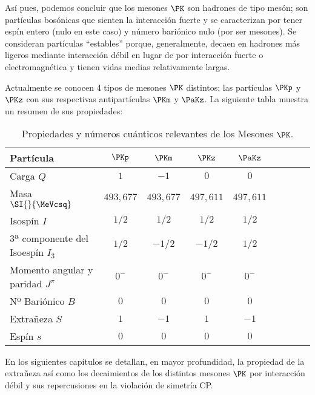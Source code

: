Así pues, podemos concluir que los mesones $\PK$ son hadrones de tipo mesón; son partículas bosónicas que sienten la interacción fuerte y se caracterizan por tener espín entero (nulo en este caso) y número bariónico nulo (por ser mesones). Se consideran partículas ``estables'' porque, generalmente, decaen en hadrones más ligeros mediante interacción débil en lugar de por interacción fuerte o electromagnética y tienen vidas medias relativamente largas.

Actualmente se conocen 4 tipos de mesones $\PK$ distintos: las partículas $\PKp$ y $\PKz$ con sus respectivas antipartículas $\PKm$ y $\PaKz$. La siguiente tabla muestra un resumen de sus propiedades:\\

\begin{table}[h]
	\centering
	\begin{tabular}{l*{7}{c}r}
\hline
Partícula & $\PKp$ & $\PKm$ & $\PKz$ & $\PaKz$ \\ 
\hline
Carga $Q$ & $1$ & $-1$ & $0$ & $0$\\
Masa $\SI{}{\MeVcsq}$ & $493,677$ & $493,677$ & $497,611$ & $497,611$\\
Isospín $I$ & $1/2$ & $1/2$ & $1/2$ & $1/2$ \\
3ª componente del Isoespín $I_3$ & $1/2$ & $-1/2$ & $-1/2$ & $1/2$ \\
Momento angular y paridad $J^\pi$ & $0^-$ & $0^-$ & $0^-$ & $0^-$ \\
Nº Bariónico $B$ & $0$ & $0$ & $0$ & $0$\\
Extrañeza $S$ & $1$ & $-1$ & $1$ & $-1$\\
Espín $s$ & $0$ & $0$ & $0$ & $0$\\ 
\hline
	\end{tabular}
\caption[Propiedades y números cuánticos relevantes de los Mesones $\PK$]{Propiedades y números cuánticos relevantes de los Mesones $\PK$.\protect\footnotemark}
\label{tab:propiedades}
\end{table}


En los siguientes capítulos se detallan, en mayor profundidad, la propiedad de la extrañeza así como los decaimientos de los distintos mesones $\PK$ por interacción débil y sus repercusiones en la violación de simetría CP.
